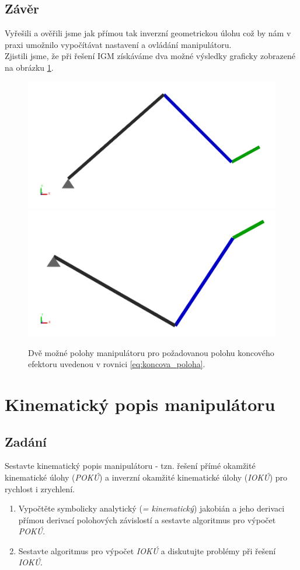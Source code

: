 \documentclass{article}
\begin{document}
		\subsection{Závěr} 
			Vyřešili a ověřili jsme jak přímou tak inverzní geometrickou úlohu což by nám v praxi umožnilo vypočítávat nastavení a ovládání manipulátoru.\\
			Zjistili jsme, že při řešení IGM získáváme dva možné výsledky graficky zobrazené na obrázku \ref{pic:IGM_polohy_manipulatoru}.
				\begin{figure}
					\centering
					\includegraphics[width=.4\textwidth]{./Graphics/2_Graphics/rameno_poloha1_white.png}\\
					\includegraphics[width=.4\textwidth]{./Graphics/2_Graphics/rameno_poloha2_white.png}
					\label{pic:IGM_polohy_manipulatoru}
					\caption{Dvě možné polohy manipulátoru pro požadovanou polohu koncového efektoru uvedenou v rovnici \ref{eq:koncova_poloha}.}
				\end{figure}
			
	\newpage
	\section{Kinematický popis manipulátoru}
		\label{section:3}
		\subsection{Zadání}
			Sestavte kinematický popis manipulátoru - tzn. řešení přímé okamžité kinematické
			úlohy (\emph{POKÚ}) a inverzní okamžité kinematické úlohy (\emph{IOKÚ}) pro rychlost
			i zrychlení. 
				\begin{enumerate}
					\item Vypočtěte symbolicky analytický (\textit{= kinematický}) jakobián a jeho derivaci přímou derivací
					polohových závislostí a sestavte algoritmus pro výpočet \emph{POKÚ}.
					\item Sestavte algoritmus pro výpočet \emph{IOKÚ} a diskutujte problémy při řešení \emph{IOKÚ}.
				\end{enumerate}
\end{document}
